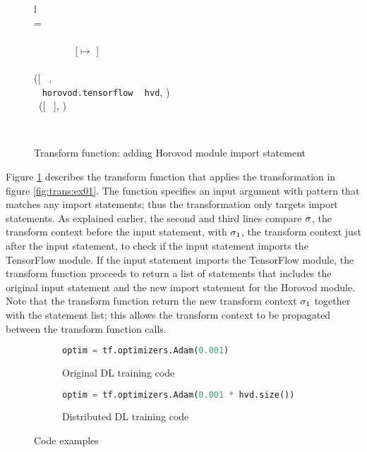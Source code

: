 \begin{figure}[ht!]
  \centering
  \noindent
  \begin{tabular}{l}
   \\
   \tstmt{\kimport ~ \mul{\nalias}}{\smodenv} = \\
    \inden \ktlet ~  ~ \kteq ~ \taalias{\mul{\nalias}}{\smodenv} \ktin \\
    \inden \ktif ~  ~ \envsub ~ \smodenv ~ \kteq ~ [\tflow $\mapsto$ \nid]\\ 
    \inden\ktthen \\
    \inden\hspace{1em} ([\kimport ~ \mul{\nalias}, \\
    \inden\hspace{1em} \kimport ~ {\tt horovod.tensorflow} \kas ~ {\tt hvd}, )\\
    \inden \ktelse~([\kimport ~ \mul{\nalias}], )
  \end{tabular}\\\vpar
  \caption{Transform function: adding Horovod module import statement}
  \label{fig:trans:fn01}
\end{figure}

Figure \ref{fig:trans:fn01} describes the transform function that applies the
transformation in figure \ref{fig:trans:ex01}. 
The function specifies an input argument with pattern that matches any import
statements; thus the transformation only targets import statements.
As explained earlier, the second and third lines
compare $\sigma$, the transform context
before the input statement, with $\sigma_{1}$, the transform context
just after the input statement, to check if the input statement
imports the TensorFlow module.
If the input statement imports the TensorFlow module,
the transform function proceeds to return a list of statements that
includes the original input statement and the new import statement for
the Horovod module.
Note that the transform function return the new transform context
$\sigma_{1}$ together with the statement list; this allows the 
transform context to be propagated between the transform function calls.

\begin{figure}[ht!]
  \centering
  \begin{subfigure}[t]{0.48\textwidth}
    \begin{lstlisting}[language=Python]
optim = tf.optimizers.Adam(0.001)\end{lstlisting}
    \caption{Original DL training code}
  \end{subfigure}
  \hspace{5mm}
  \begin{subfigure}[t]{0.48\textwidth}
    \begin{lstlisting}[language=Python]
optim = tf.optimizers.Adam(0.001 * hvd.size())\end{lstlisting}
    \caption{Distributed DL training code}
  \end{subfigure}
  \caption{Code examples}
  \label{fig:trans:ex02}
\end{figure}


